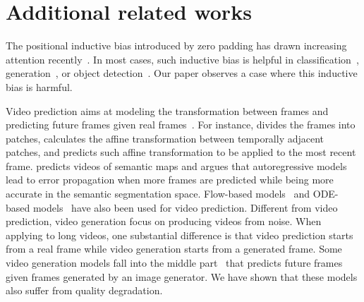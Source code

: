 
\section{Additional related works}
The positional inductive bias introduced by zero padding has drawn increasing attention recently~\cite{islam2019much,kayhan2020translation,xu2021positional,alsallakh2021mind}. In most cases, such inductive bias is helpful in classification~\cite{islam2019much}, generation~\cite{xu2021positional}, or object detection~\cite{alsallakh2021mind}. Our paper observes a case where this inductive bias is harmful. 

 Video prediction aims at modeling the transformation between frames and predicting future frames given real frames~\cite{ranzato2014video,srivastava2015unsupervised,finn2016unsupervised,van2017transformation,kumar2019videoflow,park2021vid}. For instance, \cite{van2017transformation} divides the frames into patches, calculates the affine transformation between temporally adjacent patches, and predicts such affine transformation to be applied to the most recent frame. \cite{luc2017predicting} predicts videos of semantic maps and argues that autoregressive models lead to error propagation when more frames are predicted while being more accurate in the semantic segmentation space. Flow-based models~\cite{kumar2019videoflow} and ODE-based models~\cite{park2021vid} have also been used for video prediction. Different from video prediction, video generation focus on producing videos from noise. When applying to long videos, one substantial difference is that video prediction starts from a real frame while video generation starts from a generated frame. Some video generation models fall into the middle part~\cite{le2021ccvs} that predicts future frames given frames generated by an image generator. We have shown that these models also suffer from quality degradation.


